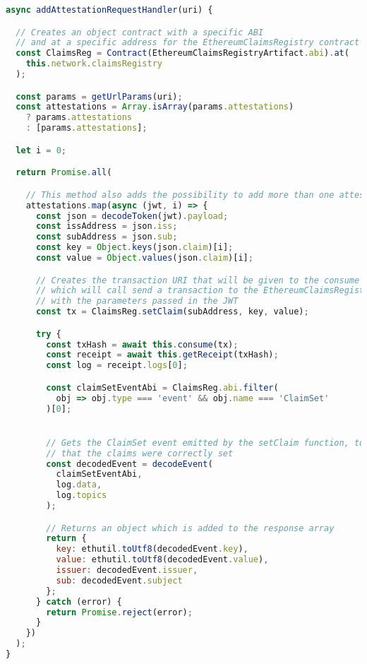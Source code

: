 \begin{itemize}
  \begin{lstlisting}[language=JavaScript, numbers=none]
async addAttestationRequestHandler(uri) {

  // Creates an object contract with a specific ABI 
  // and at a specific address for the EthereumClaimsRegistry contract
  const ClaimsReg = Contract(EthereumClaimsRegistryArtifact.abi).at(
    this.network.claimsRegistry
  );

  const params = getUrlParams(uri);
  const attestations = Array.isArray(params.attestations)
    ? params.attestations
    : [params.attestations];

  let i = 0;

  return Promise.all(

    // This method also adds the possibility to add more than one attestation a time
    attestations.map(async (jwt, i) => {
      const json = decodeToken(jwt).payload;
      const issAddress = json.iss;
      const subAddress = json.sub;
      const key = Object.keys(json.claim)[i];
      const value = Object.values(json.claim)[i];

      // Creates the transaction URI that will be given to the consume function
      // which will call send a transaction to the EthereumClaimsRegistry contract on the private blockchain
      // with the parameters passed in the JWT
      const tx = ClaimsReg.setClaim(subAddress, key, value);

      try {
        const txHash = await this.consume(tx);
        const receipt = await this.getReceipt(txHash);
        const log = receipt.logs[0];

        const claimSetEventAbi = ClaimsReg.abi.filter(
          obj => obj.type === 'event' && obj.name === 'ClaimSet'
        )[0];


        // Gets the ClaimSet event emitted by the setClaim function, to give feedback to the NodeJS backend
        // that the claims were correctly set
        const decodedEvent = decodeEvent(
          claimSetEventAbi,
          log.data,
          log.topics
        );

        // Returns an object which is added to the response array
        return {
          key: ethutil.toUtf8(decodedEvent.key),
          value: ethutil.toUtf8(decodedEvent.value),
          issuer: decodedEvent.issuer,
          sub: decodedEvent.subject
        };
      } catch (error) {
        return Promise.reject(error);
      }
    })
  );
}
  \end{lstlisting}
\end{itemize}

